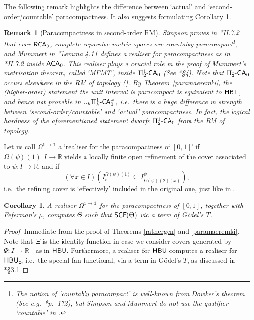 \documentclass[reqno]{amsart}
\newtheorem{cor}[thm]{Corollary}
\newtheorem{rem}[thm]{Remark}
\newcommand\be{\begin{equation}}
\newcommand\ee{\end{equation}}
\def\SIX{\Pi_{2}^{1}\text{-\textsf{\textup{CA}}}_{0}}
\def\SIXK{\Pi_{k}^{1}\text{-\textsf{\textup{CA}}}_{0}^{\omega}}
\def\c{\textup{\textsf{c}}}
\def\RCA{\textup{\textsf{RCA}}}
\def\RCAo{\textup{\textsf{RCA}}_{0}^{\omega}}
\def\R{{\mathbb  R}}
\def\di{\rightarrow}
\def\ACA{\textup{\textsf{ACA}}}
\def\HBU{\textup{\textsf{HBU}}}
\def\HBT{\textup{\textsf{HBT}}}
\def\LIN{\textup{\textsf{LIN}}}
\def\SCF{\textup{\textsf{SCF}}}
\numberwithin{equation}{section}
\numberwithin{thm}{section}
\begin{document}
\smallskip

The following remark highlights the difference between `actual' and `second-order/countable' paracompactness.  It also suggests formulating Corollary \ref{thetam}. 
\begin{rem}[Paracompactness in second-order RM]\label{diemummy}\rm
Simpson proves in \cite{simpson2}*{II.7.2} that over $\RCA_{0}$, complete separable metric spaces are \emph{countably} paracompact\footnote{The notion of `countably paracompact' is well-known from Dowker's theorem (See e.g.\ \cite{ooskelly}*{p.\ 172}), but Simpson and Mummert do not use the qualifier `countable' in \cites{simpson2,mummymf}.}, 
and Mummert in \cite{mummymf}*{Lemma 4.11} defines a realiser for paracompactness as in \cite{simpson2}*{II.7.2} inside $\ACA_{0}$.  This realiser plays a crucial role in the proof of Mummert's metrisation theorem, called `MFMT', inside $\SIX$ (See \cite{mummymf}*{\S4}).  
Note that $\SIX$ occurs elsewhere in the RM of topology (\cite{mummy, mummyphd}).  By Theorem~\ref{paramaeremki}, the (higher-order) statement \emph{the unit interval is paracompact} is equivalent to $\HBT$, and hence not provable in $\cup_{k}\SIXK$, i.e.\ there is a 
\emph{huge} difference in strength between `second-order/countable' and `actual' paracompactness.  In fact, the logical hardness of the aforementioned statement dwarfs $\SIX$ from the RM of topology.  
\end{rem}
Let us call $\Omega^{\mathbb{1}\di\mathbb{1}}$ a `realiser for the paracompactness of $[0,1]$' if $\Omega(\psi)(1):I\di \R$ yields a locally finite open refinement of the cover associated to $\psi:I\di \R$, and if 
\be\label{popol}
(\forall x\in I)(I_{x}^{\Omega(\psi)(1)}\subseteq I_{\Omega(\psi)(2)(x)}^{\psi}),
\ee
i.e.\ the refining cover is `effectively' included in the original one, just like in \cite{simpson2, mummymf}.
\begin{cor}\label{thetam}
A realiser $\Omega^{\mathbb{1}\di \mathbb{1}}$ for the paracompactness of $[0,1]$, together with Feferman's $\mu$, computes $\Theta$ such that $\SCF(\Theta)$ via a term of G\"odel's $T$.
\end{cor}
\begin{proof}
Immediate from the proof of Theorems \ref{rathergen} and \ref{paramaeremki}.  Note that $\Xi$ is the identity function in case we consider covers generated by $\Psi:I\di \R^{+}$ as in $\HBU$. 
Furthermore, a realiser for $\HBU$ computes a realiser for $\HBU_{\c}$, i.e.\ the special fan functional, via a term in G\"odel's $T$, as discussed in \cite{dagsamIII}*{\S3.1}
\end{proof}
\end{document}
